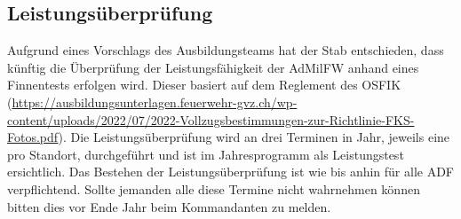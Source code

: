 \newpage
\begin{adjustwidth}{1.5cm}{1.5cm}
\section*{Leistungsüberprüfung}
Aufgrund eines Vorschlags des Ausbildungsteams hat der Stab entschieden, dass künftig die Überprüfung der Leistungsfähigkeit der AdMilFW anhand eines Finnentests erfolgen wird.
Dieser basiert auf dem Reglement des OSFIK (\href{https://ausbildungsunterlagen.feuerwehr-gvz.ch/wp-content/uploads/2022/07/2022-Vollzugsbestimmungen-zur-Richtlinie-FKS-Fotos.pdf}{https://ausbildungsunterlagen.feuerwehr-gvz.ch/wp-content/uploads/2022/07/2022-Vollzugsbestimmungen-zur-Richtlinie-FKS-Fotos.pdf}).
Die Leistungsüberprüfung wird an drei Terminen in Jahr, jeweils eine pro Standort, durchgeführt und ist im Jahresprogramm als Leistungstest ersichtlich.
Das Bestehen der Leistungsüberprüfung ist wie bis anhin für alle ADF verpflichtend.  Sollte jemanden alle diese Termine nicht wahrnehmen können bitten dies vor Ende Jahr beim Kommandanten zu melden.



\end{adjustwidth}